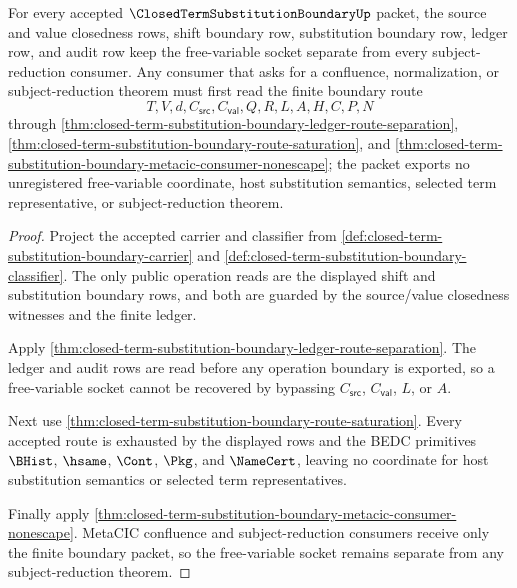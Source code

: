 \begin{theorem}
\label{thm:closed-term-substitution-boundary-socket-separation}
For every accepted $\ClosedTermSubstitutionBoundaryUp$ packet, the source and value closedness rows, shift boundary row, substitution boundary row, ledger row, and audit row keep the free-variable socket separate from every subject-reduction consumer. Any consumer that asks for a confluence, normalization, or subject-reduction theorem must first read the finite boundary route
$$
T,V,d,C_{\mathsf{src}},C_{\mathsf{val}},Q,R,L,A,H,C,P,N
$$
through \autoref{thm:closed-term-substitution-boundary-ledger-route-separation}, \autoref{thm:closed-term-substitution-boundary-route-saturation}, and \autoref{thm:closed-term-substitution-boundary-metacic-consumer-nonescape}; the packet exports no unregistered free-variable coordinate, host substitution semantics, selected term representative, or subject-reduction theorem.
\end{theorem}
\begin{proof}
Project the accepted carrier and classifier from \autoref{def:closed-term-substitution-boundary-carrier} and \autoref{def:closed-term-substitution-boundary-classifier}. The only public operation reads are the displayed shift and substitution boundary rows, and both are guarded by the source/value closedness witnesses and the finite ledger.

Apply \autoref{thm:closed-term-substitution-boundary-ledger-route-separation}. The ledger and audit rows are read before any operation boundary is exported, so a free-variable socket cannot be recovered by bypassing $C_{\mathsf{src}}$, $C_{\mathsf{val}}$, $L$, or $A$.

Next use \autoref{thm:closed-term-substitution-boundary-route-saturation}. Every accepted route is exhausted by the displayed rows and the BEDC primitives $\BHist$, $\hsame$, $\Cont$, $\Pkg$, and $\NameCert$, leaving no coordinate for host substitution semantics or selected term representatives.

Finally apply \autoref{thm:closed-term-substitution-boundary-metacic-consumer-nonescape}. MetaCIC confluence and subject-reduction consumers receive only the finite boundary packet, so the free-variable socket remains separate from any subject-reduction theorem.
\end{proof}


